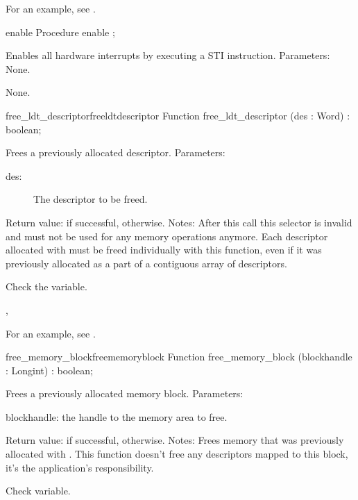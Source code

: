 For an example, see .
\begin{procedure}{enable}
\Declaration
Procedure enable ;

\Description

Enables all hardware interrupts by executing a STI instruction.
Parameters: None.

\Errors
None.
\SeeAlso
\end{procedure}
\begin{functionl}{free\_ldt\_descriptor}{freeldtdescriptor}
\Declaration
Function free\_ldt\_descriptor (des : Word) : boolean;

\Description
Frees a previously allocated descriptor.
Parameters:
\begin{description}
\item[des:\ ] The descriptor to be freed.
\end{description}
Return value:  if successful,  otherwise.
Notes: After this call this selector is invalid and must not be used for any
memory operations anymore. Each descriptor allocated with
 must be freed 
individually with this function,
even if it was previously allocated as a part of a contiguous array of
descriptors.

\Errors
Check the  variable.
\SeeAlso

,

\end{functionl}
For an example, see 
.
\begin{functionl}{free\_memory\_block}{freememoryblock}
\Declaration
Function free\_memory\_block (blockhandle :
Longint) : boolean;

\Description
Frees a previously allocated memory block.
Parameters: 
\begin{description}
\item{blockhandle:} the handle to the memory area to free.
\end{description}
Return value:  if successful,  otherwise.
Notes: Frees memory that was previously allocated with
 . 
This function doesn't free any descriptors mapped to this block, 
it's the application's responsibility.

\Errors
 Check  variable.
\SeeAlso
{} 
\end{functionl}
